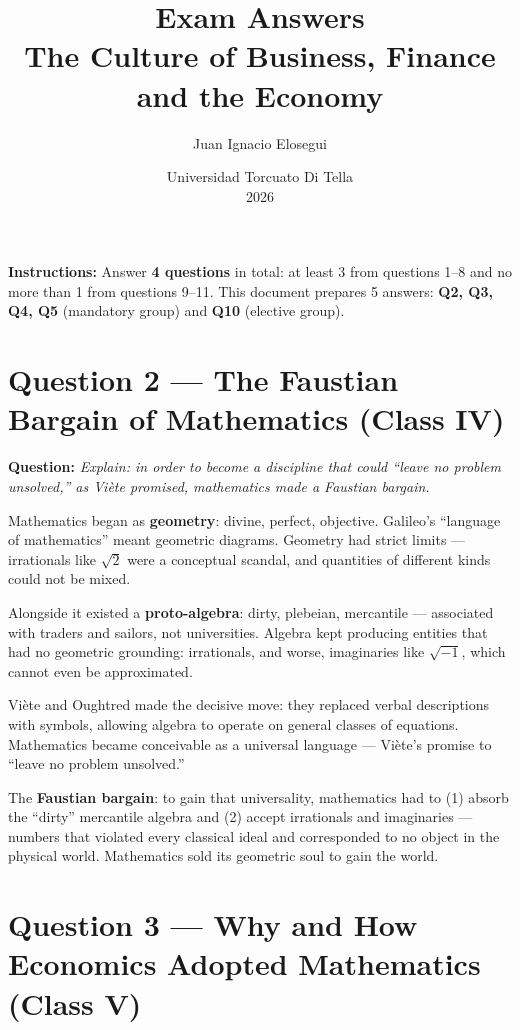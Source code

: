 \documentclass[a4paper,12pt]{article}
\title{\vspace{-2cm}\textbf{Exam Answers}\\[0.2cm]
\large The Culture of Business, Finance and the Economy}
\author{Juan Ignacio Elosegui}
\date{Universidad Torcuato Di Tella \\ 2026}
\begin{document}
\maketitle

\noindent\textbf{Instructions:} Answer \textbf{4 questions} in total: at least 3 from questions 1--8 and no more than 1 from questions 9--11. This document prepares 5 answers: \textbf{Q2, Q3, Q4, Q5} (mandatory group) and \textbf{Q10} (elective group).

\vspace{1em}

\section{Question 2 — The Faustian Bargain of Mathematics (Class IV)}

\textbf{Question:} \textit{Explain: in order to become a discipline that could ``leave no problem unsolved,'' as Viète promised, mathematics made a Faustian bargain.}

Mathematics began as \textbf{geometry}: divine, perfect, objective. Galileo's ``language of mathematics'' meant geometric diagrams. Geometry had strict limits --- irrationals like $\sqrt{2}$ were a conceptual scandal, and quantities of different kinds could not be mixed.

Alongside it existed a \textbf{proto-algebra}: dirty, plebeian, mercantile --- associated with traders and sailors, not universities. Algebra kept producing entities that had no geometric grounding: irrationals, and worse, imaginaries like $\sqrt{-1}$, which cannot even be approximated.

Viète and Oughtred made the decisive move: they replaced verbal descriptions with symbols, allowing algebra to operate on general classes of equations. Mathematics became conceivable as a universal language --- Viète's promise to ``leave no problem unsolved.''

The \textbf{Faustian bargain}: to gain that universality, mathematics had to (1) absorb the ``dirty'' mercantile algebra and (2) accept irrationals and imaginaries --- numbers that violated every classical ideal and corresponded to no object in the physical world. Mathematics sold its geometric soul to gain the world.

\vspace{1.5em}

\section{Question 3 — Why and How Economics Adopted Mathematics (Class V)}
\end{document}
